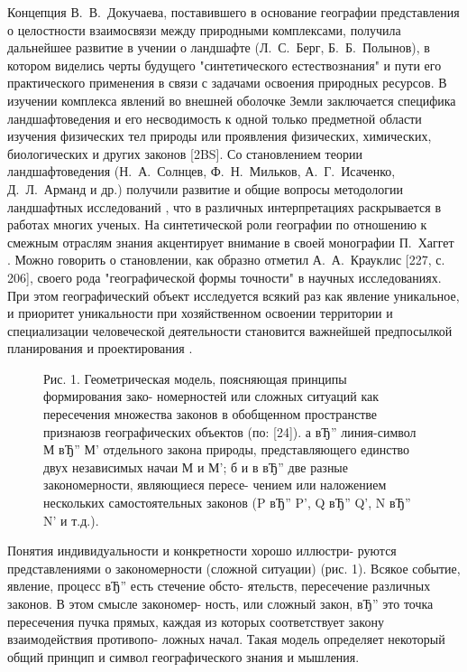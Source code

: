 \documentclass[14pt,draft,openany]{extbook}
\begin{document}
Концепция В.~В.~Докучаева, поставившего в основание географии представления о целостности взаимосвязи между природными комплексами, получила дальнейшее развитие в учении о ландшафте (Л.~С.~Берг, Б.~Б.~Полынов), в котором виделись черты будущего "синтетического естествознания" и пути его практического применения в связи с задачами освоения природных ресурсов. В изучении комплекса явлений во внешней оболочке Земли заключается специфика ландшафтоведения и его несводимость к одной только предметной области изучения физических тел природы или проявления физических, химических, биологических и других законов [2BS]. Со становлением теории ландшафтоведения (Н.~А.~Солнцев, Ф.~Н.~Мильков, А.~Г.~Исаченко, Д.~Л.~Арманд и др.) получили развитие и общие вопросы методологии ландшафтных исследований \cite{b288}, что в различных интерпретациях раскрывается в работах многих ученых. На синтетической роли географии по отношению к смежным отраслям знания акцентирует внимание в своей монографии П.~Хаггет \cite{b450}. Можно говорить о становлении, как образно отметил А.~А.~Крауклис [227, с. 206], своего рода "географической формы точности" в научных исследованиях. При этом географический объект исследуется всякий раз как явление уникальное, и приоритет уникальности при хозяйственном освоении территории и специализации человеческой деятельности становится важнейшей предпосылкой планирования и проектирования \cite{b351}.

\begin{figure}
Рис. 1. Геометрическая модель, поясняющая принципы формирования зако-
номерностей или сложных ситуаций как пересечения множества законов в
обобщенном пространстве признаюзв географических объектов (по: [24]).
а вЂ” линия-символ М вЂ” М' отдельного закона природы, представляющего единство двух
независимых начаи М и М'; б и в вЂ” две разные закономерности, являющиеся пересе-
чением или наложением нескольких самостоятельных законов (P вЂ” P', Q вЂ” Q', N вЂ” N'
и т.д.).
\end{figure}


Понятия индивидуальности и конкретности хорошо иллюстри-
руются представлениями о закономерности (сложной ситуации)
(рис. 1). Всякое событие, явление, процесс вЂ” есть стечение обсто-
ятельств, пересечение различных законов. В этом смысле закономер-
ность, или сложный закон, вЂ” это точка пересечения пучка прямых,
каждая из которых соответствует закону взаимодействия противопо-
ложных начал. Такая модель определяет некоторый общий принцип
и символ географического знания и мышления.
\end{document}
